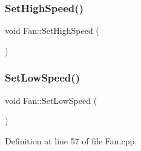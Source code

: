 \subsubsection{\texorpdfstring{Set\+High\+Speed()}{SetHighSpeed()}\hspace{0.1cm}{\footnotesize\ttfamily [2/2]}}
{\footnotesize\ttfamily void Fan\+::\+Set\+High\+Speed (\begin{DoxyParamCaption}{ }\end{DoxyParamCaption})\hspace{0.3cm}{\ttfamily [protected]}}

\mbox{\label{class_fan_a817f97adfe3990ef302f49359b3237f7}} 
\subsubsection{\texorpdfstring{Set\+Low\+Speed()}{SetLowSpeed()}\hspace{0.1cm}{\footnotesize\ttfamily [1/2]}}
{\footnotesize\ttfamily void Fan\+::\+Set\+Low\+Speed (\begin{DoxyParamCaption}{ }\end{DoxyParamCaption})\hspace{0.3cm}{\ttfamily [protected]}}



Definition at line 57 of file Fan.\+cpp.

